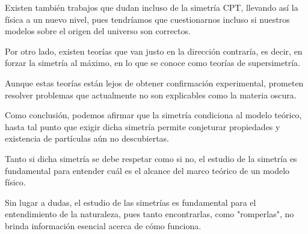 Existen también trabajos que dudan incluso de la simetría CPT, llevando así la física a un nuevo nivel, pues tendríamos que cuestionarnos incluso si nuestros modelos sobre el origen del universo son correctos.

Por otro lado, existen teorías que van justo en la dirección contraría, es decir, en forzar la simetría al máximo, en lo que se conoce como teorías de supersimetría.

Aunque estas teorías están lejos de obtener confirmación experimental, prometen resolver problemas que actualmente no son explicables como la materia oscura.

Como conclusión, podemos afirmar que la simetría condiciona al modelo teórico, hasta tal punto que exigir dicha simetría permite conjeturar propiedades y existencia de partículas aún no descubiertas.

Tanto si dicha simetría se debe respetar como si no, el estudio de la simetría es fundamental para entender cuál es el alcance del marco teórico de un modelo físico.

Sin lugar a dudas, el estudio de las simetrías es fundamental para el entendimiento de la naturaleza, pues tanto encontrarlas, como "romperlas", no brinda información esencial acerca de cómo funciona.